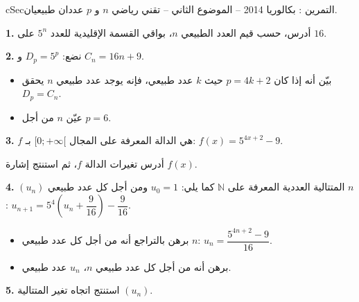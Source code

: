 \documentclass[12pt,a4paper]{article}
\newenvironment{BOX}[2]{\begin{otherlanguage}{english}\begin{arbox}{#1}{#2}}{\end{arbox}\end{otherlanguage}}
\newcounter{exo}
\newenvironment{tamrin}[1]{\stepcounter{exo}\begin{BOX}{cSec}{التمرين \theexo: #1}}{\end{BOX}}
\newcommand{\N}{\mathbb{N}}
\newenvironment{sq}{\begin{itemize}[leftmargin=2.4em,itemsep=3pt]}{\end{itemize}}
\newcommand{\qa}{\item[(أ)]}\newcommand{\qb}{\item[(ب)]}\newcommand{\qc}{\item[(جـ)]}\newcommand{\qd}{\item[(د)]}\newcommand{\qe}{\item[(هـ)]}
\begin{document}
\begin{tamrin}{بكالوريا 2014 -- الموضوع الثاني -- تقني رياضي}
$n$ و $p$ عددان طبيعيان.

\textbf{1.} أدرس، حسب قيم العدد الطبيعي $n$، بواقي القسمة الإقليدية للعدد $5^n$ على $16$.

\textbf{2.} نضع: $D_p=5^p$ و $C_n=16n+9$.
\begin{sq}
\qa بيّن أنه إذا كان $p=4k+2$ حيث $k$ عدد طبيعي، فإنه يوجد عدد طبيعي $n$ يحقق $D_p=C_n$.
\qb عيّن $n$ من أجل $p=6$.
\end{sq}

\textbf{3.} $f$ هي الدالة المعرفة على المجال $[0;+\infty[$ بـ: $f(x)=5^{4x+2}-9$.

أدرس تغيرات الدالة $f$، ثم استنتج إشارة $f(x)$.

\textbf{4.} $(u_n)$ المتتالية العددية المعرفة على $\N$ كما يلي: $u_0=1$ ومن أجل كل عدد طبيعي $n$:
$u_{n+1}=5^4\left(u_n+\dfrac{9}{16}\right)-\dfrac{9}{16}$.
\begin{sq}
\qa برهن بالتراجع أنه من أجل كل عدد طبيعي $n$: $u_n=\dfrac{5^{4n+2}-9}{16}$.
\qb برهن أنه من أجل كل عدد طبيعي $n$، $u_n$ عدد طبيعي.
\end{sq}

\textbf{5.} استنتج اتجاه تغير المتتالية $(u_n)$.
\end{tamrin}
\end{document}
